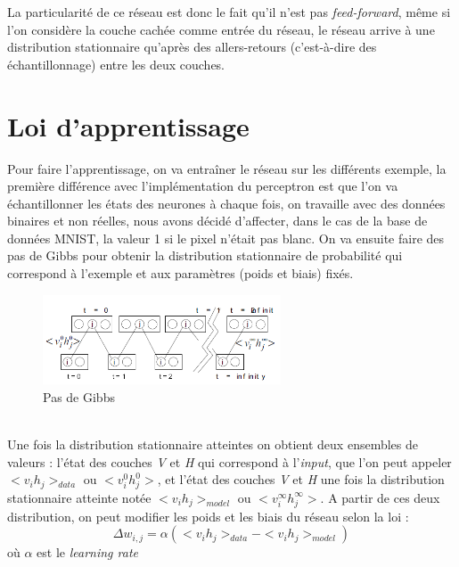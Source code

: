 \documentclass[a4paper,oneside]{report}
\begin{document}
 La particularité de ce réseau est donc le fait qu'il n'est pas
                \textit{feed-forward}, même si l'on considère la couche cachée comme entrée du
                réseau, le réseau arrive à une distribution stationnaire qu'après des allers-retours (c'est-à-dire des échantillonnage) entre
les deux couches.

\section{Loi d'apprentissage}

Pour faire l'apprentissage, on va entraîner le réseau sur les différents exemple, la première différence avec l'implémentation du perceptron est
que l'on va  échantillonner les états des neurones à chaque fois, on travaille avec des données binaires et non réelles, nous avons décidé 
d'affecter, dans le cas de la base de données MNIST, la valeur 1 si le pixel n'était pas blanc.
On va ensuite faire des pas de Gibbs pour obtenir la distribution stationnaire de probabilité
 qui correspond à l'exemple et aux paramètres (poids et biais) fixés.
\begin{figure}[!h]
                    \begin{center}
                        \includegraphics[width=200pt]{Images/Gibbs.png}
                    \end{center}
                    \caption{Pas de Gibbs}
\end{figure}\\

Une fois la distribution stationnaire atteintes on obtient deux ensembles de valeurs : l'état des couches \textit{V} et  \textit{H}
qui correspond à l'\textit{input}, que l'on peut appeler \begin{math}<v_{i}h_{j}>_{data}\end{math} ou \begin{math}<v_{i}^{0}h_{j}^{0}>\end{math}, et l'état des couches \textit{V} et  \textit{H} une fois la distribution stationnaire atteinte notée \begin{math}<v_{i}h_{j}>_{model}\end{math} ou \begin{math}<v_{i}^{\infty}h_{j}^{\infty}>\end{math}. A partir de ces deux distribution, on peut modifier les poids et les biais du réseau selon la loi :
                \begin{equation}
                    \Delta w_{i,j} = \alpha (<v_{i}h_{j}>_{data} - <v_{i}h_{j}>_{model} )
                \end{equation}
                où \begin{math}\alpha\end{math} est le \textit{learning rate}\\
\end{document}
